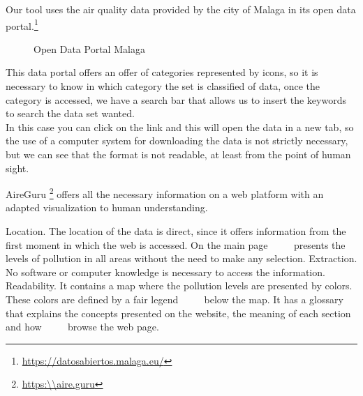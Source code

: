 Our tool uses the air quality data provided by the city of Malaga in its open data portal.\footnote{\url{https://datosabiertos.malaga.eu/}}\\
\begin{figure}[ht]
    \centering
    \hfill
    \vfill
  
  \caption{Open Data Portal Malaga}
    \end{figure}

    This data portal offers an offer of categories represented by icons, so it is necessary to know in which category the set is classified
    of data, once the category is accessed, we have a search bar that allows us to insert the keywords to search the data set
    wanted.\\
    
    In this case you can click on the link and this will open the data in a new tab, so the use of a computer system
    for downloading the data is not strictly necessary, but we can see that the format is not readable, at least from the point
    of human sight.

AireGuru \footnote{\url{https:\\aire.guru}} offers all the necessary information on a web platform with an adapted visualization
to human understanding.
\newpage
{}  

\begin{itemize}
    \done Location. The location of the data is direct, since it offers information from the first moment in which the web is accessed. On the main page
         presents the levels of pollution in all areas without the need to make any selection.
    \done Extraction. No software or computer knowledge is necessary to access the information.
    \done Readability. It contains a map where the pollution levels are presented by colors. These colors are defined by a fair legend
         below the map. It has a glossary that explains the concepts presented on the website, the meaning of each section and how
         browse the web page.
 

\end{itemize}
\newpage

 



